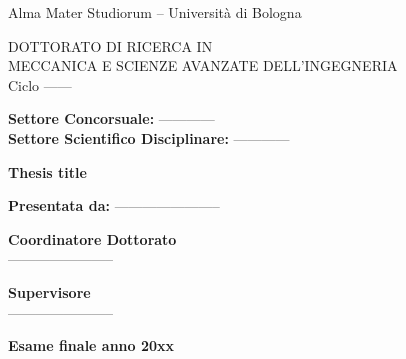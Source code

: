 \documentclass[a4paper,12pt]{book}
\begin{document}
	\begin{titlepage}
		
		\begin{center}
			\Large{Alma Mater Studiorum -- Universit\`a di
				Bologna}
		\end{center}
		\vspace{3mm}
		\begin{center}
			\Large{DOTTORATO DI RICERCA IN} \\
			\vspace{4pt}
			\Large{MECCANICA E SCIENZE AVANZATE DELL'INGEGNERIA} \\
			\vspace{8mm}
			\large{Ciclo ------}
		\end{center}
		\vspace{5mm}
		\normalsize{\textbf{Settore Concorsuale:} ------------}
		\vspace{5mm} \\
		\normalsize{\textbf{Settore Scientifico Disciplinare:} ------------}
		\vspace{30mm}
		\begin{center}
			\LARGE{\bf Thesis title} \\
		\end{center}
		\vspace{30mm}
		\large{\textbf{Presentata da:} -----------------------}
		\vspace{25mm} \\
		\begin{minipage}[t]{0.39\textwidth} \raggedright
			\large{\textbf{Coordinatore Dottorato} \\
				\vspace{5mm}
				-----------------------}
		\end{minipage}
		\hfill
		\begin{minipage}[t]{0.28\textwidth} \raggedright
			\large{\textbf{Supervisore} \\
				\vspace{5mm}
				-----------------------}
		\end{minipage}
		\vfill
		\begin{center}
			\normalsize{\textbf{Esame finale anno 20xx}}
		\end{center}
	
	\end{titlepage}
\end{document}
